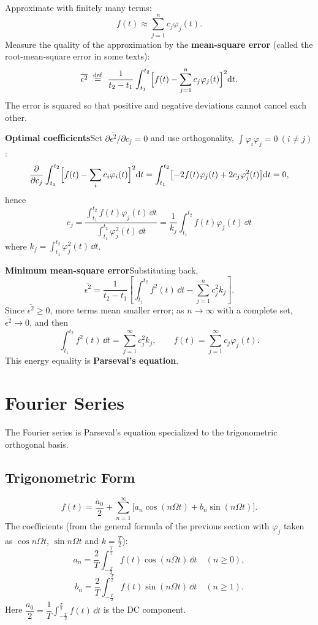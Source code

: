 Approximate with finitely many terms:
\[
    f(t)\approx\sum_{j=1}^{n}c_j\varphi_j(t).
\]
Measure the quality of the approximation by the \textbf{mean-square error}
(called the root-mean-square error in some texts):
\[
    \overline{\epsilon^{2}}\ \overset{\mathrm{def}}{=}\
    \frac{1}{t_2-t_1}\int_{t_1}^{t_2}
    \Bigl[f(t)-\sum_{j=1}^{n}c_j\varphi_j(t)\Bigr]^{2}\dd t .
\]
The error is squared so that positive and negative deviations cannot cancel
each other.

\textbf{Optimal coefficients}\quad Set
$\partial\overline{\epsilon^{2}}/\partial c_j=0$ and use orthogonality,
$\int\varphi_i\varphi_j=0\ (i\neq j)$:
\[
    \frac{\partial}{\partial c_j}\int_{t_1}^{t_2}
    \Bigl[f(t)-\sum_{i}c_i\varphi_i(t)\Bigr]^{2}\mathrm{d} t
    =\int_{t_1}^{t_2}\bigl[-2f(t)\varphi_j(t)+2c_j\varphi_j^{2}(t)\bigr]\mathrm{d} t=0,
\]
hence
\[
    \boxed{\;
    c_j=\frac{\displaystyle\int_{t_1}^{t_2}f(t)\varphi_j(t)\,\dd t}
             {\displaystyle\int_{t_1}^{t_2}\varphi_j^{2}(t)\,\dd t}
       =\frac{1}{k_j}\int_{t_1}^{t_2}f(t)\varphi_j(t)\,\dd t\;}
\]
where $k_j=\displaystyle\int_{t_1}^{t_2}\varphi_j^{2}(t)\,\dd t$.

\textbf{Minimum mean-square error}\quad Substituting back,
\[
    \overline{\epsilon^{2}}=\frac{1}{t_2-t_1}
    \left[\int_{t_1}^{t_2}f^{2}(t)\,\dd t-\sum_{j=1}^{n}c_j^{2}k_j\right].
\]
Since $\overline{\epsilon^{2}}\ge 0$, more terms mean smaller error; as
$n\to\infty$ with a complete set, $\overline{\epsilon^{2}}\to 0$, and then
\[
    \int_{t_1}^{t_2}f^{2}(t)\,\dd t=\sum_{j=1}^{\infty}c_j^{2}k_j,
    \qquad
    f(t)=\sum_{j=1}^{\infty}c_j\varphi_j(t).
\]
This energy equality is \textbf{Parseval's equation}.

\section{Fourier Series}

The Fourier series is Parseval's equation specialized to the trigonometric
orthogonal basis.

\subsection{Trigonometric Form}

\begin{equation}
    f(t)=\frac{a_0}{2}+\sum_{n=1}^{\infty}
    \bigl[a_n\cos(n\Omega t)+b_n\sin(n\Omega t)\bigr].
\end{equation}
The coefficients (from the general formula of the previous section with
$\varphi_j$ taken as $\cos n\Omega t$, $\sin n\Omega t$ and $k=\frac{T}{2}$):
\[
    a_n=\frac{2}{T}\int_{-\frac{T}{2}}^{\frac{T}{2}}f(t)\cos(n\Omega t)\,\dd t
    \quad(n\ge 0),
\]
\[
    b_n=\frac{2}{T}\int_{-\frac{T}{2}}^{\frac{T}{2}}f(t)\sin(n\Omega t)\,\dd t
    \quad(n\ge 1).
\]
Here $\dfrac{a_0}{2}=\dfrac{1}{T}\displaystyle\int_{-\frac{T}{2}}^{\frac{T}{2}}f(t)\,\dd t$
is the DC component.

